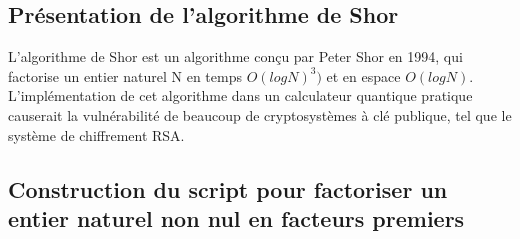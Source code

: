 \documentclass[12pt]{article}
\begin{document}
\subsection{Présentation de l'algorithme de Shor}
L'algorithme de Shor est un algorithme conçu par Peter Shor en 1994, qui factorise un entier naturel N en temps $O(log N)^3)$ et en espace $O(log N)$.
L'implémentation de cet algorithme dans un calculateur quantique pratique causerait la vulnérabilité de beaucoup de cryptosystèmes à clé publique, tel que le système de chiffrement RSA.

\subsection{Construction du script pour factoriser un entier naturel non nul en facteurs premiers}
\end{document}
